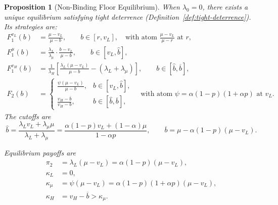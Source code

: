 \documentclass[11pt]{article}
\theoremstyle{plain}
\theoremstyle{definition}
\theoremstyle{plain}
\theoremstyle{plain}
\theoremstyle{plain}
\theoremstyle{plain}
\newtheorem{prop}[thm]{Proposition}
\numberwithin{equation}{section}
\begin{document}
\vspace{0.4cm}

\begin{prop}[Non-Binding Floor Equilibrium] \label{prop:nonbinding}
When $\lambda_0 = 0$, there exists a unique equilibrium satisfying tight deterrence (Definition~\ref{def:tight-deterrence}). Its strategies are:
\begin{align*}
F_1^{v_L}(b) &= \frac{\mu - v_L}{\mu - b}, \qquad b \in [r, v_L], \quad \text{with atom } \frac{\mu - v_L}{\mu - r} \text{ at } r, \\[4pt]
F_1^{\mu}(b) &= \frac{\lambda_L}{\lambda_{\mu}} \cdot \frac{b - v_L}{\mu - b}, \qquad b \in [v_L, \hat{b}], \\[4pt]
F_1^{v_H}(b) &= \frac{1}{\lambda_H}\left[\frac{\lambda_L(\mu - v_L)}{\mu - b} - (\lambda_L + \lambda_{\mu})\right], \qquad b \in [\hat{b}, \overline{b}], \\[4pt]
F_2(b) &= \begin{cases}
\frac{\psi(\mu - v_L)}{\mu - b}, & b \in [v_L, \hat{b}], \\[4pt]
\frac{v_H - \overline{b}}{v_H - b}, & b \in [\hat{b}, \overline{b}],
\end{cases} \quad \text{with atom } \psi = \alpha(1-p)(1+\alpha p) \text{ at } v_L.
\end{align*}
\vspace{0.2cm}
\noindent The cutoffs are
\[
\hat{b} = \frac{\lambda_L v_L + \lambda_{\mu} \mu}{\lambda_L + \lambda_{\mu}} = \frac{\alpha(1-p)v_L + (1-\alpha)\mu}{1 - \alpha p}, \qquad \overline{b} = \mu - \alpha(1-p)(\mu - v_L).
\]

\noindent Equilibrium payoffs are
\begin{align*}
\pi_2 &= \lambda_L (\mu - v_L) = \alpha(1-p)(\mu - v_L), \\[3pt]
\kappa_L &= 0, \\[3pt]
\kappa_{\mu} &= \psi (\mu - v_L) = \alpha(1-p)(1+\alpha p)(\mu - v_L), \\[3pt]
\kappa_H &= v_H - \overline{b} > \kappa_{\mu}.
\end{align*}
\end{prop}
\vspace{0.2cm}
\end{document}
